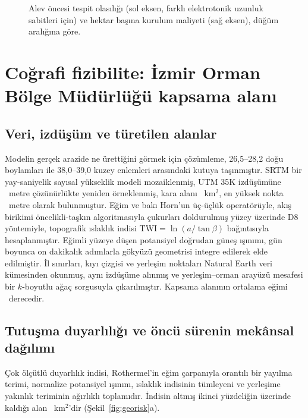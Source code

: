 \documentclass[11pt,a4paper]{article}
\begin{document}
\begin{figure}[htbp]\centering

\caption{Alev öncesi tespit olasılığı (sol eksen, farklı elektrotonik uzunluk
sabitleri için) ve hektar başına kurulum maliyeti (sağ eksen), düğüm aralığına
göre.}
\label{fig:coverage}
\end{figure}

\section{Coğrafi fizibilite: İzmir Orman Bölge Müdürlüğü kapsama alanı}

\subsection{Veri, izdüşüm ve türetilen alanlar}

Modelin gerçek arazide ne ürettiğini görmek için çözümleme, 26,5--28,2 doğu
boylamları ile 38,0--39,0 kuzey enlemleri arasındaki kutuya taşınmıştır. SRTM
bir yay-saniyelik sayısal yükseklik modeli mozaiklenmiş, UTM 35K izdüşümüne
\geoRes~metre çözünürlükte yeniden örneklenmiş, kara alanı \geoLandArea~km$^2$,
en yüksek nokta \geoElevMax~metre olarak bulunmuştur. Eğim ve bakı Horn'un
üç-üçlük operatörüyle, akış birikimi öncelikli-taşkın algoritmasıyla çukurları
doldurulmuş yüzey üzerinde D8 yöntemiyle, topografik ıslaklık indisi
$\mathrm{TWI} = \ln(a/\tan\beta)$ bağıntısıyla hesaplanmıştır. Eğimli yüzeye
düşen potansiyel doğrudan güneş ışınımı, gün boyunca on dakikalık adımlarla
gökyüzü geometrisi integre edilerek elde edilmiştir. İl sınırları, kıyı çizgisi
ve yerleşim noktaları Natural Earth veri kümesinden okunmuş, aynı izdüşüme
alınmış ve yerleşim--orman arayüzü mesafesi bir $k$-boyutlu ağaç sorgusuyla
çıkarılmıştır. Kapsama alanının ortalama eğimi \geoSlopeMean\ derecedir.

\subsection{Tutuşma duyarlılığı ve öncü sürenin mekânsal dağılımı}

Çok ölçütlü duyarlılık indisi, Rothermel'in eğim çarpanıyla orantılı bir
yayılma terimi, normalize potansiyel ışınım, ıslaklık indisinin tümleyeni ve
yerleşime yakınlık teriminin ağırlıklı toplamıdır. İndisin altmış ikinci
yüzdeliğin üzerinde kaldığı alan \geoHighArea~km$^2$'dir
(Şekil~\ref{fig:georisk}a).
\end{document}
